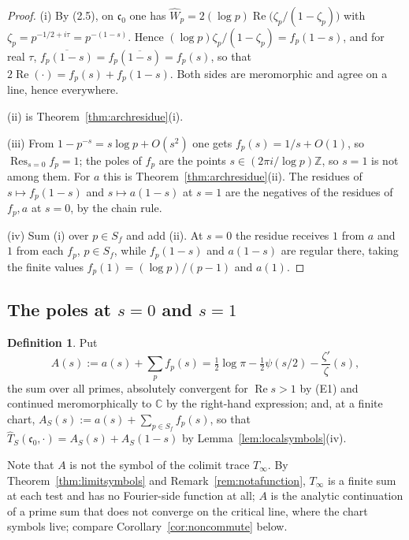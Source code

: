 \documentclass[11pt]{amsart}
\theoremstyle{definition}
\newtheorem{definition}[theorem]{Definition}
\theoremstyle{remark}
\newcommand{\C}{\mathbb C}
\newcommand{\Z}{\mathbb Z}
\newcommand{\Rel}{\operatorname{Re}}
\newcommand{\Res}{\operatorname*{Res}}
\newcommand{\cz}{\mathfrak c_0}
\begin{document}
\begin{proof}
(i)  By (2.5), on $\cz$ one has
$\widehat W_p=2(\log p)\Rel\bigl(\zeta_p/(1-\zeta_p)\bigr)$ with
$\zeta_p=p^{-1/2+i\tau}=p^{-(1-s)}$.  Hence
$(\log p)\zeta_p/(1-\zeta_p)=f_p(1-s)$, and for real $\tau$,
$\overline{f_p(1-s)}=f_p(\overline{1-s})=f_p(s)$, so that
$2\Rel(\cdot)=f_p(s)+f_p(1-s)$.  Both sides are meromorphic and agree on a
line, hence everywhere.

(ii) is Theorem~\ref{thm:archresidue}(i).

(iii)  From $1-p^{-s}=s\log p+O(s^2)$ one gets $f_p(s)=1/s+O(1)$, so
$\Res_{s=0}f_p=1$; the poles of $f_p$ are the points $s\in(2\pi i/\log p)\Z$,
so $s=1$ is not among them.  For $a$ this is
Theorem~\ref{thm:archresidue}(ii).  The residues of $s\mapsto f_p(1-s)$ and
$s\mapsto a(1-s)$ at $s=1$ are the negatives of the residues of $f_p,a$ at
$s=0$, by the chain rule.

(iv)  Sum (i) over $p\in S_f$ and add (ii).  At $s=0$ the residue receives $1$
from $a$ and $1$ from each $f_p$, $p\in S_f$, while $f_p(1-s)$ and $a(1-s)$ are
regular there, taking the finite values $f_p(1)=(\log p)/(p-1)$ and $a(1)$.
\end{proof}

\subsection{The poles at \texorpdfstring{$s=0$ and $s=1$}{s=0 and s=1}}

\begin{definition}
\label{def:A}
Put
\begin{equation}
  A(s):=a(s)+\sum_pf_p(s)
       =\tfrac12\log\pi-\tfrac12\psi(s/2)-\frac{\zeta'}{\zeta}(s),
\tag{10.2}
\end{equation}
the sum over all primes, absolutely convergent for $\Rel s>1$ by (E1) and
continued meromorphically to $\C$ by the right-hand expression; and, at a
finite chart, $A_S(s):=a(s)+\sum_{p\in S_f}f_p(s)$, so that
$\widehat T_S(\cz,\cdot)=A_S(s)+A_S(1-s)$ by
Lemma~\ref{lem:localsymbols}(iv).
\end{definition}

Note that $A$ is not the symbol of the colimit trace $T_\infty$.  By
Theorem~\ref{thm:limitsymbols} and Remark~\ref{rem:notafunction}, $T_\infty$ is
a finite sum at each test and has no Fourier-side function at all; $A$ is the
analytic continuation of a prime sum that does not converge on the critical
line, where the chart symbols live; compare
Corollary~\ref{cor:noncommute} below.
\end{document}
